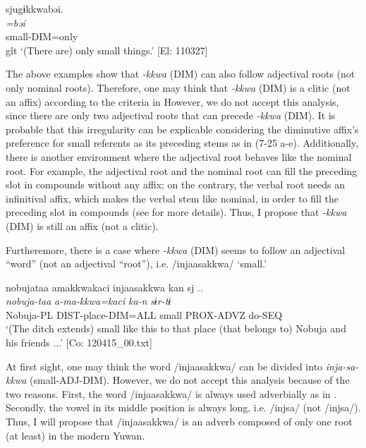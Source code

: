 \ex \label{ex:7:b}%
\glll  sjugɨkkwabəi.\\
\textit{=bəi}\\
small-DIM=only\\
glt ‘(There are) only small things.’ [El: 110327]
\z
\z

The above examples show that \textit{{}-kkwa} (DIM) can also follow adjectival roots (not only nominal roots). Therefore, one may think that \textit{{}-kkwa} (DIM) is a clitic (not an affix) according to the criteria in  However, we do not accept this analysis, since there are only two adjectival roots that can precede \textit{-kkwa} (DIM). It is probable that this irregularity can be explicable considering the diminutive affix’s preference for small referents as its preceding stems as in (7-25 a-e). Additionally, there is another environment where the adjectival root behaves like the nominal root. For example, the adjectival root and the nominal root can fill the preceding slot in compounds without any affix; on the contrary, the verbal root needs an infinitival affix, which makes the verbal stem like nominal, in order to fill the preceding slot in compounds (see  for more details). Thus, I propose that \textit{{}-kkwa} (DIM) is still an affix (not a clitic).

Furtheremore, there is a case where \textit{{}-kkwa} (DIM) seems to follow an adjectival “word” (not an adjectival “root”), i.e. /injaasakkwa/ ‘small.’

\ea \label{ex:7:30}  %
\glll  nobujataa  amakkwakaci  injaasakkwa  kan  sj ..\\
\textit{nobuja-taa}  \textit{a-ma-kkwa=kaci}  \textit{}  \textit{ka-n}  \textit{sɨr-tɨ}\\
Nobuja-PL  DIST-place-DIM=ALL  small  PROX-ADVZ  do-SEQ\\
\glt ‘(The ditch extends) small like this to that place (that belongs to) Nobuja and his friends ...’ [Co: 120415\_00.txt]
\z

At first sight, one may think the word /injaasakkwa/ can be divided into \textit{inja-sa-kkwa} (small-ADJ-DIM). However, we do not accept this analysis because of the two reasons. First, the word /injaasakkwa/ is always used adverbially as in . Secondly, the vowel in its middle position is always long, i.e. /injsa/ (not /injsa/). Thus, I will propose that /injaasakkwa/ is an adverb composed of only one root (at least) in the modern Yuwan.
